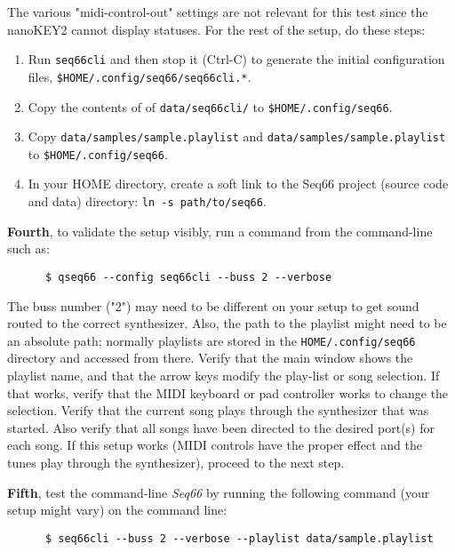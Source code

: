    The various "midi-control-out" settings are not relevant for this test since
   the nanoKEY2 cannot display statuses.
   For the rest of the setup, do these steps:

   \begin{enumerate}
      \item Run \texttt{seq66cli} and then stop it (Ctrl-C) to generate the
         initial configuration files,
         \texttt{\$HOME/.config/seq66/seq66cli.*}.
      \item Copy the contents of of \texttt{data/seq66cli/} to
         \texttt{\$HOME/.config/seq66}.
      \item Copy \texttt{data/samples/sample.playlist} and
         \texttt{data/samples/sample.playlist} to
         \texttt{\$HOME/.config/seq66}.
      \item In your HOME directory, create a soft link to the Seq66 project
         (source code and data) directory: \texttt{ln -s path/to/seq66}.
   \end{enumerate}

   \textbf{Fourth}, to validate the setup visibly, run a command from the
   command-line such as:

   \begin{verbatim}
      $ qseq66 --config seq66cli --buss 2 --verbose
   \end{verbatim}


   The buss number ("2") may need to be different on your setup to get sound
   routed to the correct synthesizer.  Also, the path to the playlist might
   need to be an absolute path; normally playlists are stored in the
   \texttt{HOME/.config/seq66} directory and accessed from there.
   Verify that the main window shows the playlist name, and that the arrow keys
   modify the play-list or song selection.  If that works, verify that the MIDI
   keyboard or pad controller works to change the selection.
   Verify that the current song plays through the synthesizer that was started.
   Also verify that all songs have been directed to the desired port(s) for
   each song.
   If this setup works (MIDI controls have the proper effect and the tunes play
   through the synthesizer), proceed to the next step.

   \textbf{Fifth}, test the command-line \textsl{Seq66} by running the
   following command (your setup might vary) on the command line:

   \begin{verbatim}
      $ seq66cli --buss 2 --verbose --playlist data/sample.playlist
   \end{verbatim}


